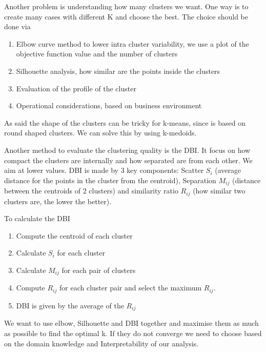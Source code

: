 Another problem is understanding how many clusters we want. One way is to create many cases with different K and choose the best. 
The choice should be done via
\begin{enumerate}
    \item Elbow curve method to lower intra cluster variability, we use a plot of the objective function value and the number of clusters
    \item Silhouette analysis, how similar are the points inside the clusters
    \item Evaluation of the profile of the cluster
    \item Operational considerations, based on business environment
\end{enumerate}

\vspace{10pt}

As said the shape of the clusters can be tricky for k-means, since is based on round shaped clusters. We can solve this by using k-medoids.

\vspace{10pt}

Another method to evaluate the clustering quality is the DBI. It focus on how compact the clusters are internally and how separated are from each other. We aim at lower values.
DBI is made by 3 key components: Scatter $S_i$ (average distance for the points in the cluster from the centroid), Separation $M_{ij}$ (distance between the centroids of 2 clusters) and similarity ratio $R_{ij}$ (how similar two clusters are, the lower the better).

To calculate the DBI

\begin{enumerate}
    \item Compute the centroid of each cluster
    \item Calculate $S_i$ for each cluster
    \item Calculate $M_{ij}$ for each pair of clusters
    \item Compute $R_{ij}$ for each cluster pair and select the maximum $R_{ij}$.
    \item DBI is given by the average of the $R_{ij}$
\end{enumerate}

\vspace{10pt}

We want to use elbow, Silhouette and DBI together and maximise them as much as possible to find the optimal k.
If they do not converge we need to choose based on the domain knowledge and Interpretability of our analysis.

